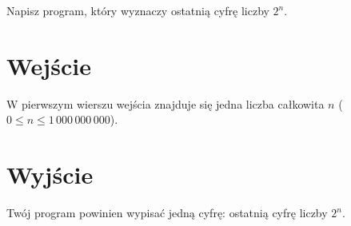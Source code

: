 \documentclass{spiral-kurs}
\begin{document}
\makeheader
%
    Napisz program, który wyznaczy ostatnią cyfrę liczby $2^n$.

    \section{Wejście}
    W pierwszym wierszu wejścia znajduje się jedna liczba całkowita $n$
    ($0 \le n \le 1\,000\,000\,000$).

    \section{Wyjście}
    Twój program powinien wypisać jedną cyfrę: ostatnią cyfrę liczby $2^n$.



  
\end{document}
